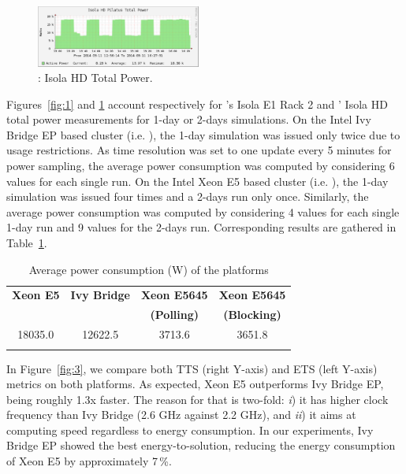 \begin{figure}[htbf]
  \begin{center}
    \includegraphics[width=0.48\textwidth]{Figs/NRJ_benchmark_Pilatus.eps}
    \caption{\pilat: Isola HD Total Power.}
    \label{fig:2}
  \end{center}
\end{figure}

Figures~\ref{fig:1}   and   \ref{fig:2}   account   respectively   for
\monch's Isola E1 Rack  2 and \pilat' Isola HD total
power measurements for  1-day or 2-days simulations. On  the Intel Ivy
Bridge EP  based cluster (i.e.  \monch),  the 1-day simulation
was issued  only twice due  to usage restrictions. As  time resolution
was set to one update every  5 minutes for power sampling, the average
power consumption was computed by considering 6 values for each single
run.  On the Intel Xeon E5 based cluster (i.e.  \pilat), the
1-day simulation  was issued  four times and  a 2-days run  only once.
Similarly, the average power consumption was computed by considering 4
values  for  each  single  1-day  run  and 9  values  for  the  2-days
run. Corresponding results are gathered in Table~\ref{tab:3}.

\begin{table}[htbf]
  \begin{center}
    \caption{Average power consumption (W) of the platforms}
    \label{tab:3}
    \begin{tabular}{cccc}
      \hline\noalign{\smallskip}
      \textbf{\scriptsize{Xeon E5}} & \textbf{\scriptsize{Ivy Bridge}} & \textbf{\scriptsize{Xeon  E5645}} & \textbf{\scriptsize{Xeon  E5645}}\\
      & & \textbf{\scriptsize{(Polling)}} & \textbf{\scriptsize{(Blocking)}} \\
      \noalign{\smallskip}\hline\noalign{\smallskip}
      18035.0 & 12622.5 & 3713.6 & 3651.8 \\ 
      \noalign{\smallskip}\hline
    \end{tabular}
  \end{center}
\end{table}

In  Figure~\ref{fig:3}, we  compare both  TTS (right  Y-axis)  and ETS
(left  Y-axis)  metrics  on  both  platforms.  As  expected,  Xeon  E5
outperforms Ivy Bridge EP, being  roughly 1.3x faster.  The reason for
that is  two-fold: \emph{i}) it has  higher clock frequency  than Ivy Bridge
(2.6  GHz  against  2.2 GHz),  and  \emph{ii})  it  aims at  computing  speed
regardless to  energy consumption.  In our experiments,  Ivy Bridge EP
showed the best energy-to-solution, reducing the energy consumption of
Xeon E5 by approximately 7\,\%.

